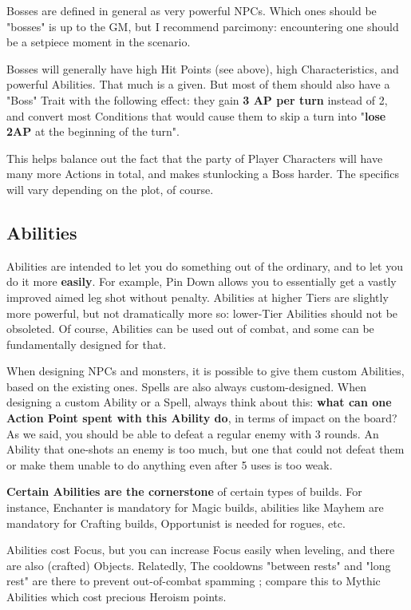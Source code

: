 Bosses are defined in general as very powerful NPCs. Which ones should be "bosses" is up to the GM, but I recommend parcimony: encountering one should be a setpiece moment in the scenario.

Bosses will generally have high Hit Points (see above), high Characteristics, and powerful Abilities. That much is a given. But most of them should also have a "Boss" Trait with the following effect: they gain \textbf{3 AP per turn} instead of 2, and convert most Conditions that would cause them to skip a turn into "\textbf{lose 2AP} at the beginning of the turn". 

This helps balance out the fact that the party of Player Characters will have many more Actions in total, and makes stunlocking a Boss harder. The specifics will vary depending on the plot, of course.




\subsection{Abilities}

Abilities are intended to let you do something out of the ordinary, and to let you do it more \textbf{easily}. For example, Pin Down allows you to essentially get a vastly improved aimed leg shot without penalty. Abilities at higher Tiers are slightly more powerful, but not dramatically more so: lower-Tier Abilities should not be obsoleted. Of course, Abilities can be used out of combat, and some can be fundamentally designed for that.

When designing NPCs and monsters, it is possible to give them custom Abilities, based on the existing ones. Spells are also always custom-designed. When designing a custom Ability or a Spell, always think about this: \textbf{what can one Action Point spent with this Ability do}, in terms of impact on the board? As we said, you should be able to defeat a regular enemy with 3 rounds. An Ability that one-shots an enemy is too much, but one that could not defeat them or make them unable to do anything even after 5 uses is too weak.

\textbf{Certain Abilities are the cornerstone} of certain types of builds. For instance, Enchanter is mandatory for Magic builds, abilities like Mayhem are mandatory for Crafting builds, Opportunist is needed for rogues, etc.

Abilities cost Focus, but you can increase Focus easily when leveling, and there are also (crafted) Objects. Relatedly, The cooldowns "between rests" and "long rest" are there to prevent out-of-combat spamming ; compare this to Mythic Abilities which cost precious Heroism points.


